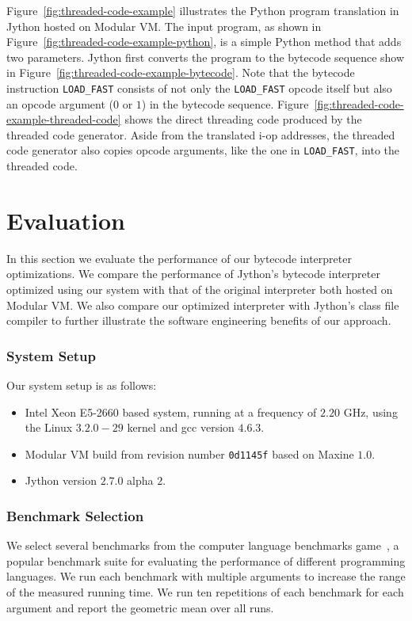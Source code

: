 Figure~\ref{fig:threaded-code-example} illustrates the Python program translation in Jython hosted on Modular VM.
The input program, as shown in Figure~\ref{fig:threaded-code-example-python}, is a simple Python method that adds two parameters.
Jython first converts the program to the bytecode sequence show in Figure~\ref{fig:threaded-code-example-bytecode}.
Note that the bytecode instruction \texttt{LOAD\_FAST} consists of not only the \texttt{LOAD\_FAST} opcode itself but also an opcode argument ($0$ or $1$) in the bytecode sequence.
Figure~\ref{fig:threaded-code-example-threaded-code} shows the direct threading code produced by the threaded code generator.
Aside from the translated i-op addresses, the threaded code generator also copies opcode arguments, like the one in \texttt{LOAD\_FAST}, into the threaded code.

\section{Evaluation}

In this section we evaluate the performance of our bytecode interpreter optimizations.
We compare the performance of Jython's bytecode interpreter optimized using our system with that of the original interpreter both hosted on Modular VM.
We also compare our optimized interpreter with Jython's class file compiler to further illustrate the software engineering benefits of our approach.

\subsubsection{System Setup}

Our system setup is as follows:
\begin{itemize}
  \item Intel Xeon E5-2660 based system, running at a frequency of $2.20$ GHz, using the Linux $3.2.0-29$ kernel and gcc version $4.6.3$.
  \item Modular VM build from revision number \texttt{0d1145f} based on Maxine $1.0$.
  \item Jython version $2.7.0$ alpha $2$.
\end{itemize}

\subsubsection{Benchmark Selection}

We select several benchmarks from the computer language benchmarks game~\cite{benchmarkgame}, a popular benchmark suite for evaluating the performance of different programming languages.
We run each benchmark with multiple arguments to increase the range of the measured running time.
We run ten repetitions of each benchmark for each argument and report the geometric mean over all runs.

